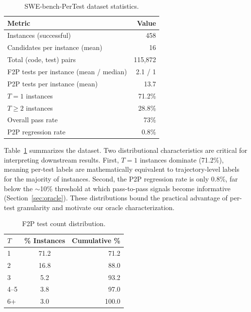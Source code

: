 \documentclass[11pt,a4paper]{article}
\begin{document}
\begin{table}[t]
\centering
\small
\begin{tabular}{lr}
\toprule
\textbf{Metric} & \textbf{Value} \\
\midrule
Instances (successful) & 458 \\
Candidates per instance (mean) & 16 \\
Total (code, test) pairs & 115{,}872 \\
F2P tests per instance (mean / median) & 2.1 / 1 \\
P2P tests per instance (mean) & 13.7 \\
$T\!=\!1$ instances & 71.2\% \\
$T\!\ge\!2$ instances & 28.8\% \\
Overall pass rate & 73\% \\
P2P regression rate & 0.8\% \\
\bottomrule
\end{tabular}
\caption{SWE-bench-PerTest dataset statistics.}
\label{tab:dataset}
\end{table}

Table~\ref{tab:dataset} summarizes the dataset.
Two distributional characteristics are critical for interpreting downstream results.
First, $T\!=\!1$ instances dominate (71.2\%), meaning per-test labels are mathematically equivalent to trajectory-level labels for the majority of instances.
Second, the P2P regression rate is only 0.8\%, far below the $\sim$10\% threshold at which pass-to-pass signals become informative (Section~\ref{sec:oracle}).
These distributions bound the practical advantage of per-test granularity and motivate our oracle characterization.

\begin{table}[t]
\centering
\small
\begin{tabular}{lcr}
\toprule
$T$ & \% Instances & Cumulative \% \\
\midrule
1 & 71.2 & 71.2 \\
2 & 16.8 & 88.0 \\
3 & 5.2 & 93.2 \\
4--5 & 3.8 & 97.0 \\
6+ & 3.0 & 100.0 \\
\bottomrule
\end{tabular}
\caption{F2P test count distribution.}
\label{tab:f2p-dist}
\end{table}

\end{document}
